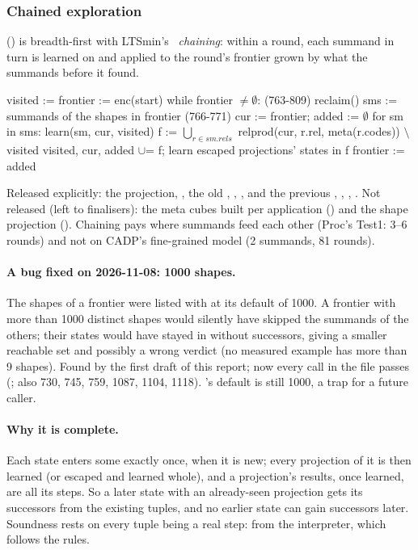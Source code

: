 \subsubsection{Chained exploration}

 () is breadth-first with
LTSmin's~\cite{kant15} \emph{chaining}: within a round, each summand in turn is learned
on and applied to the round's frontier grown by what the summands before
it found.

\begin{shell}[mathescape=true]
visited := frontier := {enc(start)}
while frontier $\ne\emptyset$:                                      (763-809)
  reclaim()
  sms := summands of the shapes in frontier     (766-771)
  cur := frontier;  added := $\emptyset$
  for sm in sms:
    learn(sm, cur, visited)
    f := $\bigcup_{r\in sm.rels}$ relprod(cur, r.rel, meta(r.codes)) $\setminus$ visited
    visited, cur, added $\cup$= f;  learn escaped projections' states in f
  frontier := added
\end{shell}

Released explicitly: the projection, , the old ,
, , and the previous , ,
, . Not released (left to finalisers): the meta
cubes built per application () and the
shape projection (). Chaining pays where
summands feed each other (Proc's Test1: 3--6 rounds) and not on CADP's
fine-grained model (2 summands, 81 rounds).

\paragraph{A bug fixed on 2026-11-08: 1000 shapes.} The shapes of a
frontier were listed with  at its default 
of 1000. A frontier with more than 1000 distinct shapes would silently have
skipped the summands of the others; their states would have stayed in
 without successors, giving a smaller reachable set and
possibly a wrong verdict (no measured example has more than 9 shapes).
Found by the first draft of this report; now every call in the file passes
 (; also 730, 745, 759,
1087, 1104, 1118). 's default is still 1000, a trap for
a future caller.

\paragraph{Why it is complete.} Each state enters some  exactly
once, when it is new; every projection of it is then learned (or escaped
and learned whole), and a projection's results, once learned, are all its
steps. So a later state with an already-seen projection gets its
successors from the existing tuples, and no earlier state can gain
successors later. Soundness rests on every tuple being a real step: from
the interpreter, which follows the rules.

